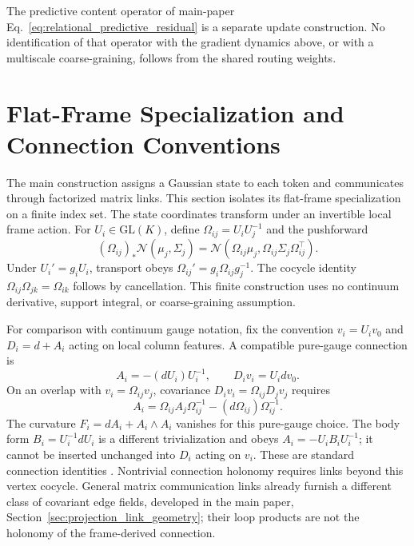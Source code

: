 \documentclass[twoside,11pt]{article}
\begin{document}
The predictive content operator of main-paper Eq.~\eqref{eq:relational_predictive_residual} is a separate update construction. No identification of that operator with the gradient dynamics above, or with a multiscale coarse-graining, follows from the shared routing weights.


\section{Flat-Frame Specialization and Connection Conventions}
\label{app:finite_geometry}

The main construction assigns a Gaussian state to each token and communicates through factorized matrix links. This section isolates its flat-frame specialization on a finite index set. The state coordinates transform under an invertible local frame action. For $U_i\in\mathrm{GL}(K)$, define $\Omega_{ij}=U_iU_j^{-1}$ and the pushforward
\begin{equation}
(\Omega_{ij})_*\mathcal N(\mu_j,\Sigma_j)
=\mathcal N(\Omega_{ij}\mu_j,\Omega_{ij}\Sigma_j\Omega_{ij}^{\top}).
\end{equation}
Under $U_i'=g_iU_i$, transport obeys $\Omega_{ij}'=g_i\Omega_{ij}g_j^{-1}$. The cocycle identity $\Omega_{ij}\Omega_{jk}=\Omega_{ik}$ follows by cancellation. This finite construction uses no continuum derivative, support integral, or coarse-graining assumption.

For comparison with continuum gauge notation, fix the convention $v_i=U_i v_0$ and $D_i=d+A_i$ acting on local column features. A compatible pure-gauge connection is
\begin{equation}
A_i=-(dU_i)U_i^{-1},\qquad
D_i v_i=U_i dv_0.
\label{eq:supp_feature_connection}
\end{equation}
On an overlap with $v_i=\Omega_{ij}v_j$, covariance $D_i v_i=\Omega_{ij}D_jv_j$ requires
\begin{equation}
A_i=\Omega_{ij}A_j\Omega_{ij}^{-1}-(d\Omega_{ij})\Omega_{ij}^{-1}.
\label{eq:supp_connection_overlap}
\end{equation}
The curvature $F_i=dA_i+A_i\wedge A_i$ vanishes for this pure-gauge choice. The body form $B_i=U_i^{-1}dU_i$ is a different trivialization and obeys $A_i=-U_iB_iU_i^{-1}$; it cannot be inserted unchanged into $D_i$ acting on $v_i$. These are standard connection identities \citep{nakahara2003geometry,frankel2011geometry}. Nontrivial connection holonomy requires links beyond this vertex cocycle. General matrix communication links already furnish a different class of covariant edge fields, developed in the main paper, Section~\ref{sec:projection_link_geometry}; their loop products are not the holonomy of the frame-derived connection.
\end{document}
